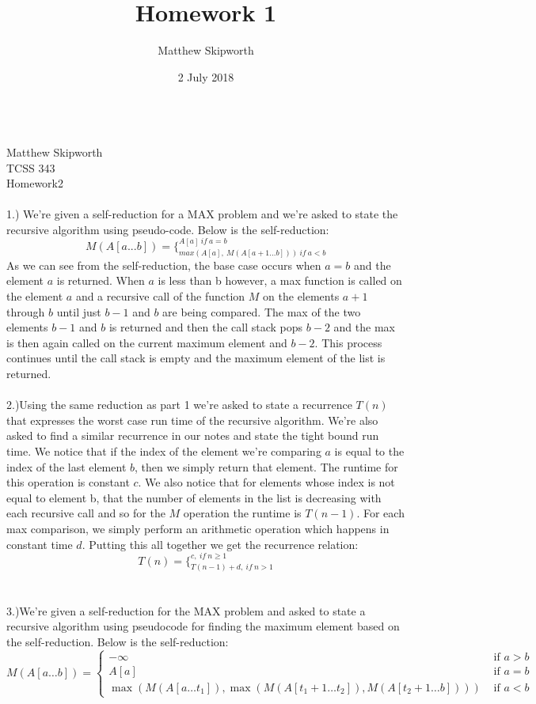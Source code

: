 \documentclass[paper=a4, 11pt]{scrartcl}
\title{Homework 1}
\author{Matthew Skipworth}
\date{2 July 2018}
\begin{document}
\ \\
Matthew Skipworth\\
TCSS 343\\
Homework2\\ \\
1.) We're given a self-reduction for a MAX problem and we're asked to state the recursive algorithm using pseudo-code. Below is the self-reduction: $$M(A[a...b])=\Bigg\{^{A[a]\ if\ a=b}_{max(A[a],\ M(A[a+1...b]))\ if\ a<b}$$ As we can see from the self-reduction, the base case occurs when $a=b$ and the element $a$ is returned. When $a$ is less than b however, a max function is called on the element $a$ and a recursive call of the function $M$ on the elements $a+1$ through $b$ until just $b-1$ and $b$ are being compared. The max of the two elements $b-1$ and $b$ is returned and then the call stack pops $b-2$ and the max is then again called on the current maximum element and $b-2$. This process continues until the call stack is empty and the maximum element of the list is returned. \\ \\
2.)Using the same reduction as part 1 we're asked to state a recurrence $T(n)$ that expresses the worst case run time of the recursive algorithm. We're also asked to find a similar recurrence in our notes and state the tight bound run time. We notice that if the index of the element we're comparing $a$ is equal to the index of the last element $b$, then we simply return that element. The runtime for this operation is constant $c$. We also notice that for elements whose index is not equal to element b, that the number of elements in the list is decreasing with each recursive call and so for the $M$ operation the runtime is $T(n-1)$. For each max comparison, we simply perform an arithmetic operation which happens in constant time $d$. Putting this all together we get the recurrence relation: $$T(n)=\Bigg\{^{c,\ if\ n\geq1}_{T(n-1)+d,\ if\ n>1}$$ \\ \\ 
3.)We're given a self-reduction for the MAX problem and asked to state a recursive algorithm using pseudocode for finding the maximum element based on the self-reduction. Below is the self-reduction: 
\[M(A[a\dots b]) = \left\{\begin{array}{cl}-\infty & \textrm{ if } a > b\\A[a] & \textrm{ if } a = b\\\max(M(A[a\dots t_1]), \max(M(A[t_1+1\dots t_2]), M(A[t_2+1\dots b]))) & \textrm{ if } a < b\end{array}\right.\]
\end{document}
